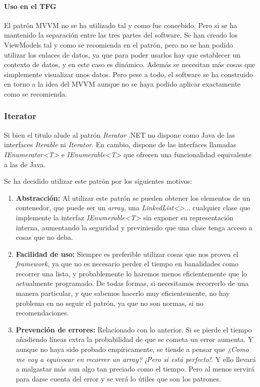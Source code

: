 \paragraph{Uso en el TFG}
El patr\'on MVVM no se ha utilizado tal y como fue concebido. Pero si se ha mantenido la separaci\'on entre
las tres partes del software. Se han creado los ViewModels tal y como se recomienda en el patr\'on, pero no
se han podido utilizar los enlaces de datos, ya que para poder usarlos hay que establecer un contexto de datos,
y en este caso es din\'amico. Adem\'as se necesitan m\'as cosas que simplemente visualizar unos datos. Pero
pese a todo, el software se ha construido en torno a la idea del MVVM aunque no se haya podido aplicar exactamente
como se recomienda.

\subsubsection{Iterator}
Si bien el titulo alude al patr\'{o}n \emph{Iterator} .NET no dispone como Java de las interfaces \emph{Iterable} ni
\emph{Iterator}.
En cambio, dispone de las interfaces llamadas \emph{IEnumerator<T>} e \emph{IEnumerable<T>} 
que ofrecen una funcionalidad equivalente a las de Java.

Se ha decidido utilizar este patr\'{o}n por los siguientes motivos:
\begin{enumerate}
    \item \textbf{Abstracci\'{o}n:}
    Al utilizar este patr\'{o}n se pueden obtener los elementos de un contenedor, que puede ser un \emph{array}, una \emph{LinkedList<>}...
    cualquier clase que implemente la interfaz \emph{IEnumerable<T>} sin
    exponer su representaci\'{o}n interna, aumentando la seguridad y previniendo que una clase tenga acceso a cosas que no deba.
    
    \item \textbf{Facilidad de uso:}
    Siempre es preferible utilizar cosas que nos provea el \emph{framework}, ya que no es necesario perder el tiempo en banalidades como 
    recorrer una lista, y probablemente lo haremos menos eficientemente que lo actualmente programado. De todas formas, si necesitamos
    recorrerlo de una manera particular, y que sabemos hacerlo muy eficientemente, no hay problema en no seguir el patr\'{o}n, ya que no son
    normas, si no recomendaciones.
    
    \item \textbf{Prevenci\'{o}n de errores:}
    Relacionado con lo anterior. Si se pierde el tiempo a\~{n}adiendo l\'{i}neas extra la probabilidad de que se cometa un error 
    aumenta. Y aunque no haya sido probado emp\'{i}ricamente, se tiende a pensar que \emph{¿Como me voy a equivocar en 
    recorrer un array? ¡Pero si est\'{a} perfecto!}. 
    Y ello llevar\'{a} a malgastar m\'{a}s aun algo tan preciado como el tiempo. Pero al menos servir\'a para darse cuenta del error y 
    se ver\'a lo \'{u}tiles que son los patrones.
\end{enumerate}

